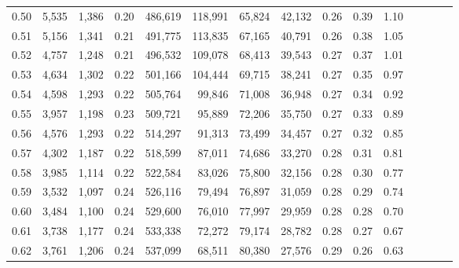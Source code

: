\begin{tabular}{rrrcrrrrrrrrrrr}
0.50 &   5,535 &  1,386 &                                       0.20 &  486,619 &  118,991 &   65,824 &   42,132 &  0.26 &  0.39 &                         1.10 \\
0.51 &   5,156 &  1,341 &                                       0.21 &  491,775 &  113,835 &   67,165 &   40,791 &  0.26 &  0.38 &                         1.05 \\
0.52 &   4,757 &  1,248 &                                       0.21 &  496,532 &  109,078 &   68,413 &   39,543 &  0.27 &  0.37 &                         1.01 \\
0.53 &   4,634 &  1,302 &                                       0.22 &  501,166 &  104,444 &   69,715 &   38,241 &  0.27 &  0.35 &                         0.97 \\
0.54 &   4,598 &  1,293 &                                       0.22 &  505,764 &   99,846 &   71,008 &   36,948 &  0.27 &  0.34 &                         0.92 \\
0.55 &   3,957 &  1,198 &                                       0.23 &  509,721 &   95,889 &   72,206 &   35,750 &  0.27 &  0.33 &                         0.89 \\
0.56 &   4,576 &  1,293 &                                       0.22 &  514,297 &   91,313 &   73,499 &   34,457 &  0.27 &  0.32 &                         0.85 \\
0.57 &   4,302 &  1,187 &                                       0.22 &  518,599 &   87,011 &   74,686 &   33,270 &  0.28 &  0.31 &                         0.81 \\
0.58 &   3,985 &  1,114 &                                       0.22 &  522,584 &   83,026 &   75,800 &   32,156 &  0.28 &  0.30 &                         0.77 \\
0.59 &   3,532 &  1,097 &                                       0.24 &  526,116 &   79,494 &   76,897 &   31,059 &  0.28 &  0.29 &                         0.74 \\
0.60 &   3,484 &  1,100 &                                       0.24 &  529,600 &   76,010 &   77,997 &   29,959 &  0.28 &  0.28 &                         0.70 \\
0.61 &   3,738 &  1,177 &                                       0.24 &  533,338 &   72,272 &   79,174 &   28,782 &  0.28 &  0.27 &                         0.67 \\
0.62 &   3,761 &  1,206 &                                       0.24 &  537,099 &   68,511 &   80,380 &   27,576 &  0.29 &  0.26 &                         0.63 \\

\end{tabular}
